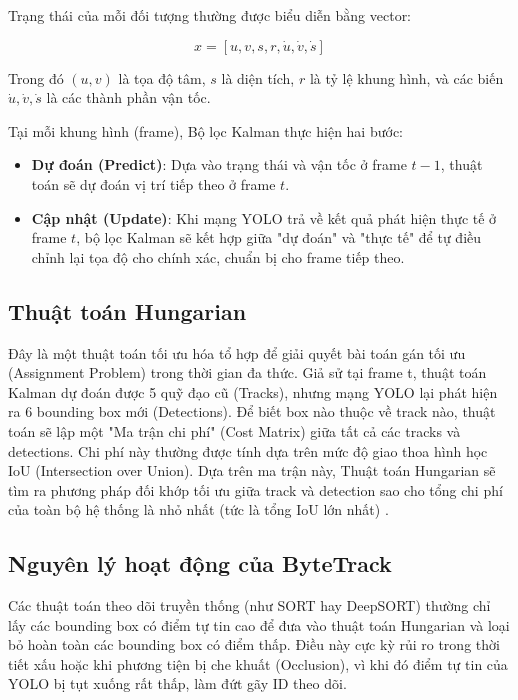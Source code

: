 Trạng thái của mỗi đối tượng thường được biểu diễn bằng vector:

$$x = [u, v, s, r, \dot{u}, \dot{v}, \dot{s}]$$

Trong đó $(u,v)$ là tọa độ tâm, $s$ là diện tích, $r$ là tỷ lệ khung hình, và các biến $\dot{u}, \dot{v}, \dot{s}$ là các thành phần vận tốc.

Tại mỗi khung hình (frame), Bộ lọc Kalman thực hiện hai bước:
\begin{itemize}
	\item \textbf{Dự đoán (Predict)}: Dựa vào trạng thái và vận tốc ở frame $t-1$, thuật toán sẽ dự đoán vị trí tiếp theo ở frame $t$.
	
	\item \textbf{Cập nhật (Update)}: Khi mạng YOLO trả về kết quả phát hiện thực tế ở frame $t$, bộ lọc Kalman sẽ kết hợp giữa "dự đoán" và "thực tế" để tự điều chỉnh lại tọa độ cho chính xác, chuẩn bị cho frame tiếp theo.
\end{itemize}

\subsection{Thuật toán Hungarian}

Đây là một thuật toán tối ưu hóa tổ hợp để giải quyết bài toán gán tối ưu (Assignment Problem) trong thời gian đa thức. Giả sử tại frame t, thuật toán Kalman dự đoán được 5 quỹ đạo cũ (Tracks), nhưng mạng YOLO lại phát hiện ra 6 bounding box mới (Detections). Để biết box nào thuộc về track nào, thuật toán sẽ lập một "Ma trận chi phí" (Cost Matrix) giữa tất cả các tracks và detections. Chi phí này thường được tính dựa trên mức độ giao thoa hình học IoU (Intersection over Union). Dựa trên ma trận này, Thuật toán Hungarian sẽ tìm ra phương pháp đối khớp tối ưu giữa track và detection sao cho tổng chi phí của toàn bộ hệ thống là nhỏ nhất (tức là tổng IoU lớn nhất) \cite{bytetrack}.

\subsection{Nguyên lý hoạt động của ByteTrack}

Các thuật toán theo dõi truyền thống (như SORT hay DeepSORT) thường chỉ lấy các bounding box có điểm tự tin cao để đưa vào thuật toán Hungarian và loại bỏ hoàn toàn các bounding box có điểm thấp. Điều này cực kỳ rủi ro trong thời tiết xấu hoặc khi phương tiện bị che khuất (Occlusion), vì khi đó điểm tự tin của YOLO bị tụt xuống rất thấp, làm đứt gãy ID theo dõi.

